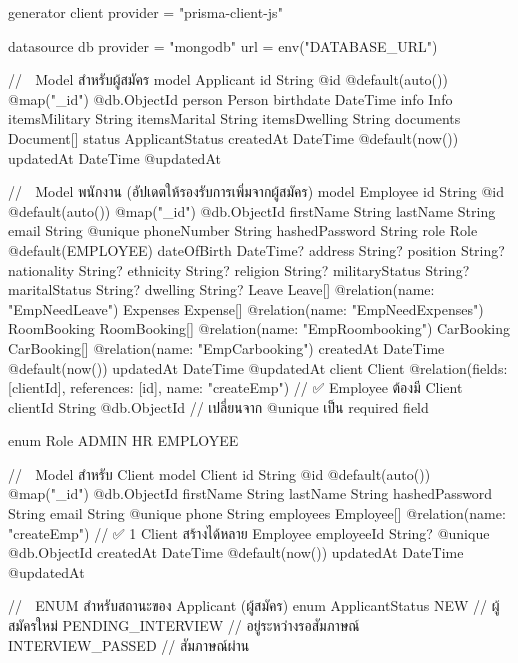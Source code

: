 generator client {
  provider = "prisma-client-js"
}

datasource db {
  provider = "mongodb"
  url      = env("DATABASE_URL")
}

// 📌 Model สำหรับผู้สมัคร
model Applicant {
  id            String          @id @default(auto()) @map("_id") @db.ObjectId
  person        Person
  birthdate     DateTime
  info          Info
  itemsMilitary String
  itemsMarital  String
  itemsDwelling String
  documents     Document[]
  status        ApplicantStatus
  createdAt     DateTime        @default(now())
  updatedAt     DateTime        @updatedAt
}

// 📌 Model พนักงาน (อัปเดตให้รองรับการเพิ่มจากผู้สมัคร)
model Employee {
  id             String        @id @default(auto()) @map("_id") @db.ObjectId
  firstName      String
  lastName       String
  email          String        @unique
  phoneNumber    String
  hashedPassword String
  role           Role          @default(EMPLOYEE)
  dateOfBirth    DateTime?
  address        String?
  position       String?
  nationality    String?
  ethnicity      String?
  religion       String?
  militaryStatus String?
  maritalStatus  String?
  dwelling       String?
  Leave          Leave[]       @relation(name: "EmpNeedLeave")
  Expenses       Expense[]     @relation(name: "EmpNeedExpenses")
  RoomBooking    RoomBooking[] @relation(name: "EmpRoombooking")
  CarBooking     CarBooking[]  @relation(name: "EmpCarbooking")
  createdAt      DateTime      @default(now())
  updatedAt      DateTime      @updatedAt
  client         Client        @relation(fields: [clientId], references: [id], name: "createEmp") // ✅ Employee ต้องมี Client
  clientId       String        @db.ObjectId // เปลี่ยนจาก @unique เป็น required field
}

enum Role {
  ADMIN
  HR
  EMPLOYEE
}

// 📌 Model สำหรับ Client
model Client {
  id             String     @id @default(auto()) @map("_id") @db.ObjectId
  firstName      String
  lastName       String
  hashedPassword String
  email          String     @unique
  phone          String
  employees      Employee[] @relation(name: "createEmp") // ✅ 1 Client สร้างได้หลาย Employee
  employeeId     String?    @unique @db.ObjectId
  createdAt      DateTime   @default(now())
  updatedAt      DateTime   @updatedAt
}

// 📌 ENUM สำหรับสถานะของ Applicant (ผู้สมัคร)
enum ApplicantStatus {
  NEW // ผู้สมัครใหม่
  PENDING_INTERVIEW // อยู่ระหว่างรอสัมภาษณ์
  INTERVIEW_PASSED // สัมภาษณ์ผ่าน
}

